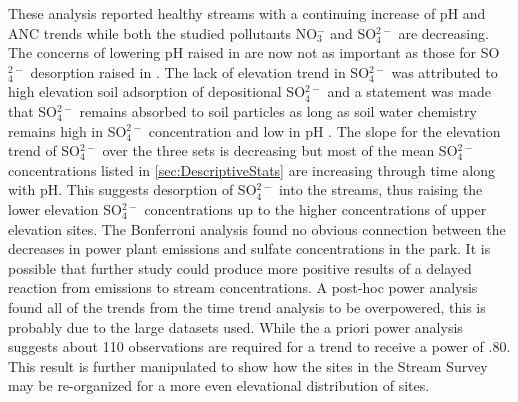 These analysis reported healthy streams with a continuing increase of pH and ANC trends while both the studied pollutants NO$_3^-$ and SO$_4^{2-}$ are decreasing.  
The concerns of lowering pH raised in \citet{robinson2008ph} are now not as important as those for SO$_4^{2-}$ desorption raised in \citet{cai2013}.  
The lack of elevation trend in SO$_4^{2-}$ was attributed to high elevation soil adsorption of depositional SO$_4^{2-}$ and a statement was made that SO$_4^{2-}$ remains absorbed to soil particles as long as soil water chemistry remains high in SO$_4^{2-}$ concentration and low in pH \citep{cai2011long}.  
The slope for the elevation trend of SO$_4^{2-}$ over the three sets is decreasing but most of the mean SO$_4^{2-}$ concentrations listed in \autoref{sec:DescriptiveStats} are increasing through time along with pH.
This suggests desorption of SO$_4^{2-}$ into the streams, thus raising the lower elevation SO$_4^{2-}$ concentrations up to the higher concentrations of upper elevation sites.
The Bonferroni analysis found no obvious connection between the decreases in power plant emissions and sulfate concentrations in the park.
It is possible that further study could produce more positive results of a delayed reaction from emissions to stream concentrations.
A post-hoc power analysis found all of the trends from the time trend analysis to be overpowered, this is probably due to the large datasets used.
While the a priori power analysis suggests about 110 observations are required for a trend to receive a power of .80.
This result is further manipulated to show how the sites in the Stream Survey may be re-organized for a more even elevational distribution of sites.


 




